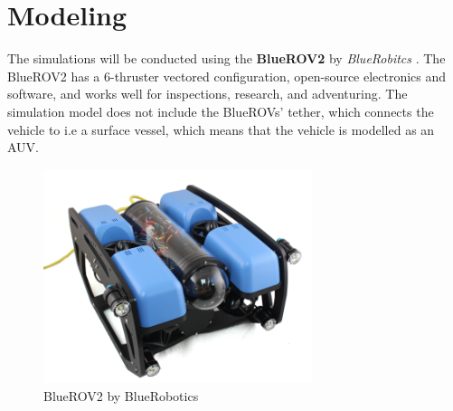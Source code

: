 \chapter{Modeling} \label{chap:modeling}
The simulations will be conducted using the \textbf{BlueROV2} by \textit{BlueRobitcs} \cite{blue}. The BlueROV2 has a 6-thruster vectored configuration, open-source electronics and software, and works well for inspections, research, and adventuring. The simulation model does not include the BlueROVs' tether, which connects the vehicle to i.e a surface vessel, which means that the vehicle is modelled as an AUV. 
\begin{figure}[H]
    \centering
    \includegraphics[width=0.7\textwidth]{images/chap4/bluerov2.png}
    \caption{BlueROV2 by BlueRobotics \cite{blue}}
    \label{fig:bluerov2}
\end{figure}
